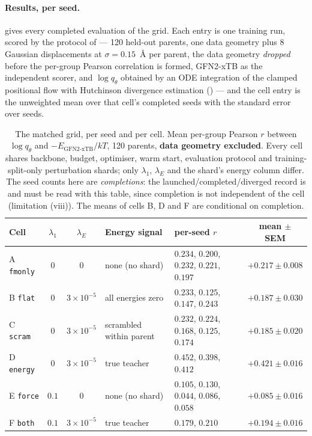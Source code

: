 \paragraph{Results, per seed.}  gives every completed evaluation of
the grid. Each entry is one training run, scored by the protocol of  ---
120 held-out parents, one data geometry plus 8 Gaussian displacements at
$\sigma = 0.15$~\AA{} per parent, the data geometry \emph{dropped} before the per-group
Pearson correlation is formed, GFN2-xTB as the independent scorer, and $\log q_\theta$
obtained by an ODE integration of the clamped positional flow with Hutchinson divergence
estimation () --- and the cell entry is the unweighted
mean over that cell's completed seeds with the standard error over seeds.

\begin{table}[h]
\caption{The matched grid, per seed and per cell. Mean per-group Pearson $r$ between
$\log q_\theta$ and $-E_{\mathrm{GFN2\text{-}xTB}}/kT$, 120 parents, \textbf{data
geometry excluded}. Every cell shares backbone, budget,
optimiser, warm start, evaluation protocol and training-split-only perturbation shards;
only $\lambda_1$, $\lambda_E$ and the shard's energy column differ. The seed counts here
are \emph{completions}: the launched/completed/diverged record is  and
must be read with this table, since completion is not independent of the cell
(limitation (viii)). The means of cells B, D and F are conditional on completion.}
\label{tab:p0seeds}
\begin{center}
\footnotesize
\setlength{\tabcolsep}{3.5pt}
\begin{tabular}{@{}l c c >{\raggedright\arraybackslash}p{1.12in} >{\raggedright\arraybackslash}p{1.74in} c@{}}
\toprule
Cell & $\lambda_1$ & $\lambda_E$ & Energy signal & per-seed $r$ & mean $\pm$ SEM \\
\midrule
A \texttt{fmonly}  & $0$   & $0$      & none (no shard)
  & $0.234$, $0.200$, $0.232$, $0.221$, $0.197$ & $+0.217 \pm 0.008$ \\
B \texttt{flat}    & $0$   & $3\times10^{-5}$ & all energies zero
  & $0.233$, $0.125$, $0.147$, $0.243$          & $+0.187 \pm 0.030$ \\
C \texttt{scram}   & $0$   & $3\times10^{-5}$ & scrambled within parent
  & $0.232$, $0.224$, $0.168$, $0.125$, $0.174$ & $+0.185 \pm 0.020$ \\
D \texttt{energy}  & $0$   & $3\times10^{-5}$ & true teacher
  & $0.452$, $0.398$, $0.412$                   & $\mathbf{+0.421 \pm 0.016}$ \\
E \texttt{force}   & $0.1$ & $0$      & none (no shard)
  & $0.105$, $0.130$, $0.044$, $0.086$, $0.058$ & $+0.085 \pm 0.016$ \\
F \texttt{both}    & $0.1$ & $3\times10^{-5}$ & true teacher
  & $0.179$, $0.210$                            & $+0.194 \pm 0.016$ \\
\bottomrule
\end{tabular}
\end{center}
\end{table}

